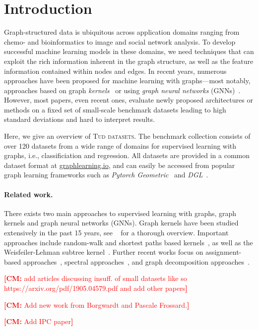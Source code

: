\documentclass{article}
\theoremstyle{definition}
\newcommand{\new}[1]{\emph{#1}}
\newcommand{\cm}[1]{{{\textcolor{red}{\textbf{[CM:} {#1}\textbf{]}}}}}
\begin{document}
\section{Introduction}
Graph-structured data is ubiquitous across application domains ranging from chemo- and bioinformatics to image and social network analysis. To develop successful machine learning models in these domains, we need techniques that can exploit the rich information inherent in the graph structure, as well as the feature information contained within nodes and edges. In recent years, numerous approaches have been proposed for machine learning with graphs---most notably, approaches based on graph \new{kernels}~\cite{Kri+2019} or using \new{graph neural networks} (GNNs)~\cite{Gil+2017}. However, most papers, even recent ones, evaluate newly proposed architectures or methods on a fixed set of small-scale benchmark datasets leading to high standard deviations and hard to interpret results. 

Here, we give an overview of \textsc{Tud datasets}. The benchmark collection consists of over 120 datasets from a wide range of domains for supervised learning with graphs, i.e., classificiation and regression. All datasets are provided in a common dataset format at \url{graphlearning.io}, and can easily be accessed from popular graph learning frameworks such as \emph{Pytorch Geometric}~\cite{Fey+2019} and \emph{DGL}~\cite{Wan+2019}.

\paragraph{Related work.}
There exists two main approaches to supervised learning with graphs, graph kernels and graph neural networks (GNNs). Graph kernels have been studied extensively in the past 15 years, see ~\cite{Kri+2019} for a thorough overview. 
Important approaches include random-walk and shortest paths based kernels~\cite{Gaertner2003,Sugiyama2015,Bor+2005,Kri+2017b}, as well as the Weisfeiler-Lehman subtree kernel~\cite{She+2011,Mor+2017}. 
Further recent works focus on assignment-based approaches~\cite{Kri+2016,Nik+2017}, spectral approaches~\cite{Kon+2016}, and graph decomposition approaches~\cite{Nik+2018}.

\cm{add articles discussing insuff. of small datasets like so https://arxiv.org/pdf/1905.04579.pdf and add other papers}

\cm{Add new work from Borgwardt and Pascale Frossard.}

\cm{Add IPC paper}
\end{document}
